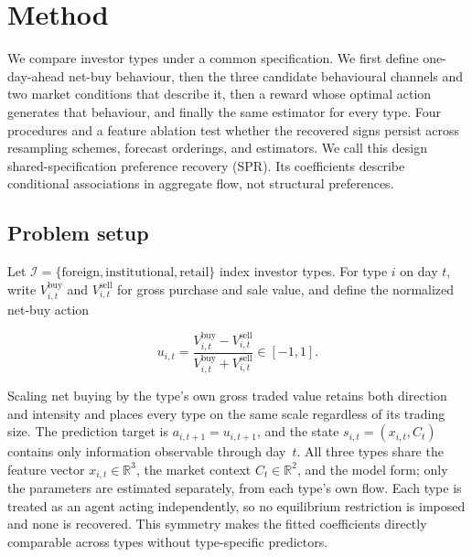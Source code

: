 
\section{Method}
\label{sec:method}


We compare investor types under a common specification. We first define
one-day-ahead net-buy behaviour, then the three candidate behavioural
channels and two market conditions that describe it, then a reward whose
optimal action generates that behaviour, and finally the same estimator
for every type. Four procedures and a feature ablation test whether the
recovered signs persist across resampling schemes, forecast orderings,
and estimators. We call this design shared-specification preference
recovery (SPR). Its coefficients describe conditional associations in
aggregate flow, not structural preferences.

\subsection{Problem setup}
\label{sec:method-setup}

Let $\mathcal{I} = \{\textrm{foreign}, \textrm{institutional},
\textrm{retail}\}$ index investor types. For type $i$ on day $t$, write
$V^{\mathrm{buy}}_{i,t}$ and $V^{\mathrm{sell}}_{i,t}$ for gross purchase
and sale value, and define the normalized net-buy action

\begin{equation}
  \label{eq:action}
  u_{i,t} = \frac{V^{\mathrm{buy}}_{i,t} - V^{\mathrm{sell}}_{i,t}}
                 {V^{\mathrm{buy}}_{i,t} + V^{\mathrm{sell}}_{i,t}}
          \in [-1, 1].
\end{equation}

Scaling net buying by the type's own gross traded value retains both
direction and intensity and places every type on the same scale
regardless of its trading size. The prediction target is
$a_{i,t+1} = u_{i,t+1}$, and the state $s_{i,t} = (x_{i,t}, C_t)$
contains only information observable through day~$t$. All three types
share the feature vector $x_{i,t} \in \mathbb{R}^3$, the market context
$C_t \in \mathbb{R}^2$, and the model form; only the parameters are
estimated separately, from each type's own flow. Each type is treated as
an agent acting independently, so no equilibrium restriction is imposed
and none is recovered. This symmetry makes the fitted coefficients
directly comparable across types without type-specific predictors.


